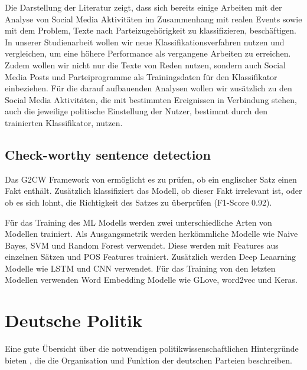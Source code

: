 Die Darstellung der Literatur zeigt, dass sich bereits einige Arbeiten mit der Analyse von Social Media Aktivitäten im Zusammenhang mit realen Events sowie mit dem Problem, Texte nach Parteizugehörigkeit zu klassifizieren, beschäftigen.
In unserer Studienarbeit wollen wir neue Klassifikationsverfahren nutzen und vergleichen, um eine höhere Performance als vergangene Arbeiten zu erreichen.
Zudem wollen wir nicht nur die Texte von Reden nutzen, sondern auch Social Media Posts und Parteiprogramme als Trainingsdaten für den Klassifikator einbeziehen.
Für die darauf aufbauenden Analysen wollen wir zusätzlich zu den Social Media Aktivitäten, die mit bestimmten Ereignissen in Verbindung stehen, auch die jeweilige politische Einstellung der Nutzer, bestimmt durch den trainierten Klassifikator, nutzen.

\subsection{Check-worthy sentence detection}



Das G2CW Framework von \textcite{jha_towards_2023} ermöglicht es zu prüfen, ob ein englischer Satz einen Fakt enthält. Zusätzlich klassifiziert das Modell, ob dieser Fakt irrelevant ist, oder ob es sich lohnt, die Richtigkeit des Satzes zu überprüfen (F1-Score \num{0.92}).

Für das Training des \ac{ML} Modells werden zwei unterschiedliche Arten von Modellen trainiert. Als Ausgangsmetrik werden herkömmliche Modelle wie Naive Bayes, \ac{SVM} und Random Forest verwendet. Diese werden mit Features aus einzelnen Sätzen und \ac{POS} Features trainiert. Zusätzlich werden Deep Leaarning Modelle wie \ac{LSTM} und \ac{CNN} verwendet. Für das Training von den letzten Modellen verwenden \textcite{jha_towards_2023} Word Embedding Modelle wie GLove, word2vec und Keras.

\section{Deutsche Politik}
Eine gute Übersicht über die notwendigen politikwissenschaftlichen Hintergründe bieten \textcite{bukow_innerparteiliche_2013}, die die Organisation und Funktion der deutschen Parteien beschreiben.

